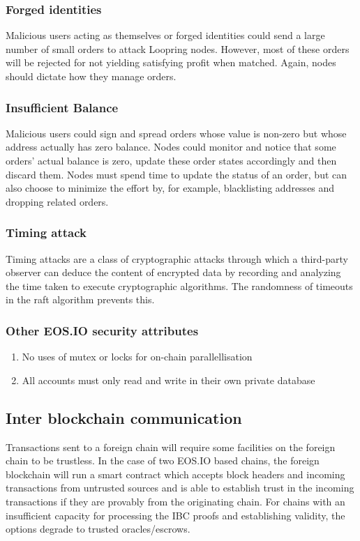 \documentclass[]{article}
\begin{document}
		
		\subsubsection{Forged identities}
		Malicious users acting as themselves or forged identities 
		could send a large number of small orders to attack Loopring
		nodes. However, most of these orders will be rejected 
		for not yielding satisfying profit when matched. 
		Again, nodes should dictate how they manage orders.
		
		\subsubsection{Insufficient Balance}
		Malicious users could sign and spread orders whose 
		value is non-zero but whose address actually has zero 
		balance. Nodes could monitor and notice that some orders' 
		actual balance is zero, update these order states accordingly
		and then discard them. Nodes must spend time to update
		the status of an order, but can also choose to minimize the
		effort by, for example, blacklisting addresses and dropping
		related orders.
		
		\subsubsection{Timing attack}
		 Timing attacks are a class of cryptographic attacks through which a third-party observer can deduce the content of encrypted data 
		 by recording and analyzing the time taken to execute cryptographic algorithms.
		 The randomness of timeouts in the raft algorithm prevents this.
		
		\subsubsection{Other EOS.IO security attributes}
		\begin{enumerate}
		\item No uses of mutex or locks for on-chain parallellisation
		\item All accounts must only read and write in their own private database
		\end{enumerate}
		
	\subsection{Inter blockchain communication}
	
	Transactions sent to a foreign chain will require some facilities on the foreign chain to be trustless. 
	In the case of two EOS.IO based chains, the foreign blockchain will run a smart contract which accepts block headers and incoming transactions 
	from untrusted sources and is able to establish trust in the incoming transactions if they are provably from the originating chain. 
	For chains with an insufficient capacity for processing the IBC proofs and establishing validity, the options degrade to trusted oracles/escrows.
	
\end{document}
